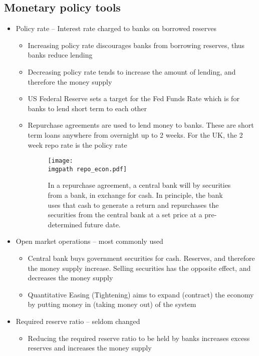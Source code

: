 \documentclass[../notes_compiled.tex]{subfiles}
\begin{document}
\subsection{Monetary policy tools}
\begin{itemize}
\item Policy rate -- Interest rate charged to banks on borrowed reserves
\begin{itemize}
\item Increasing policy rate discourages banks from borrowing reserves, thus banks reduce lending
\item Decreasing policy rate tends to increase the amount of lending, and therefore the money supply
\item US Federal Reserve sets a target for the Fed Funds Rate which is for banks to lend short term to each other
\item Repurchase agreements are used to lend money to banks. These are short term loans anywhere from overnight up to 2 weeks. For the UK, the 2 week repo rate is the policy rate

\begin{figure}[h]
  \centering
  \texttt{[image: \\imgpath repo\_econ.pdf]}
  \caption{In a repurchase agreement, a central bank will by securities from a bank, in exchange for cash. In principle, the bank uses that cash to generate a return and repurchases the securities from the central bank at a set price at a pre-determined future date.}
\end{figure}

\end{itemize}
\item Open market operations -- most commonly used
\begin{itemize}
\item Central bank buys government securities for cash. Reserves, and therefore the money supply increase. Selling securities has the opposite effect, and decreases the money supply
\item Quantitative Easing (Tightening) aims to expand (contract) the economy by putting money in (taking money out) of the system
\end{itemize}
\item Required reserve ratio -- seldom changed
\begin{itemize}
\item Reducing the required reserve ratio to be held by banks increases excess reserves and increases the money supply
\end{itemize}
\end{itemize}
\end{document}
